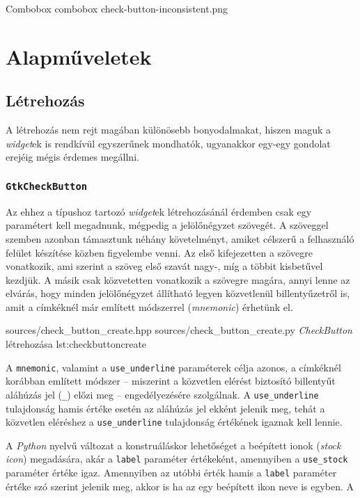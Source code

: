 {Combobox}
{combobox}
{check-button-inconsistent.png}

\section{Alapműveletek}

\subsection{Létrehozás}

A létrehozás nem rejt magában különösebb bonyodalmakat, hiszen maguk a \textit{widget}ek is rendkívül egyszerűnek mondhatók, ugyanakkor egy-egy gondolat erejéig mégis érdemes megállni.

\subsubsection{\texttt{GtkCheckButton}}

Az ehhez a típushoz tartozó \textit{widget}ek létrehozásánál érdemben csak egy paramétert kell megadnunk, mégpedig a jelölőnégyzet szövegét. A szöveggel szemben azonban támasztunk néhány követelményt, amiket célszerű a felhasználó felület készítése közben figyelembe venni. Az első kifejezetten a szövegre vonatkozik, ami szerint a szöveg első szavát nagy-, míg a többit kisbetűvel kezdjük. A másik csak közvetetten vonatkozik a szövegre magára, annyi lenne az elvárás, hogy minden jelölőnégyzet állítható legyen közvetlenül billentyűzetről is, amit a címkéknél már említett módszerrel (\textit{mnemonic}) érhetünk el.

{sources/check_button_create.hpp}
{sources/check_button_create.py}
{\textit{CheckButton} létrehozása}
{lst:checkbuttoncreate}

A \texttt{mnemonic}, valamint a \texttt{use\_underline} paraméterek célja azonos, a címkéknél korábban említett módszer -- miszerint a közvetlen elérést biztosító billentyűt aláhúzás jel (\texttt{\_}) előzi meg -- engedélyezésére szolgálnak. A \texttt{use\_underline} tulajdonság hamis értéke esetén az aláhúzás jel ekként jelenik meg, tehát a közvetlen eléréshez a \texttt{use\_underline} tulajdonság értékének igaznak kell lennie.

A \textit{Python} nyelvű változat a konstruáláskor lehetőséget a beépített ionok (\textit{stock icon}) megadására, akár a \texttt{label} paraméter értékeként, amennyiben a \texttt{use\_stock} paraméter értéke igaz. Amennyiben az utóbbi érték hamis a \texttt{label} paraméter értéke szó szerint jelenik meg, akkor is ha az egy beépített ikon neve is egyben. A 

